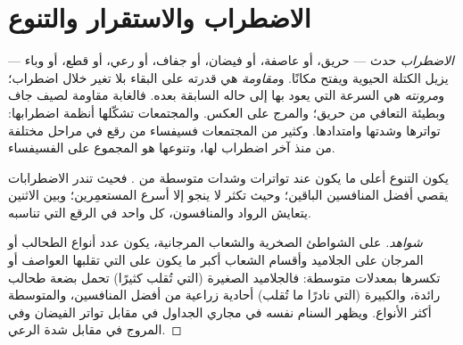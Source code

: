 \section{الاضطراب والاستقرار والتنوع}

\begin{definition}\label{def:b1:ecosystem-dynamics:disturbance}
\emph{الاضطراب} حدث --- حريق، أو عاصفة، أو فيضان، أو جفاف،
أو رعي، أو قطع، أو وباء --- يزيل الكتلة الحيوية ويفتح
مكانًا. و\emph{مقاومة}  هي قدرته على البقاء
بلا تغير خلال اضطراب؛ و\emph{مرونته} هي السرعة
التي يعود بها إلى حاله السابقة بعده. فالغابة
مقاومة لصيف جاف وبطيئة التعافي من حريق؛
والمرج على العكس. والمجتمعات تشكّلها أنظمة
اضطرابها: تواترها وشدتها وامتدادها. وكثير من
المجتمعات فسيفساء من رقع في مراحل مختلفة من
 منذ آخر اضطراب لها، وتنوعها هو
المجموع على الفسيفساء.
\end{definition}

\begin{proposition}\label{prop:b1:ecosystem-dynamics:idh}
يكون التنوع أعلى ما يكون عند تواترات وشدات متوسطة من
. فحيث تندر الاضطرابات يقصي أفضل المنافسين
الباقين؛ وحيث تكثر لا ينجو إلا أسرع
المستعمِرين؛ وبين الاثنين يتعايش الرواد والمنافسون،
كل واحد في الرقع التي تناسبه.
\end{proposition}
\begin{proof}[شواهد]
على الشواطئ الصخرية والشعاب المرجانية، يكون عدد أنواع الطحالب أو
المرجان على الجلاميد وأقسام الشعاب أكبر ما يكون على التي
تقلبها العواصف أو تكسرها بمعدلات متوسطة: فالجلاميد الصغيرة
(التي تُقلب كثيرًا) تحمل بضعة طحالب رائدة، والكبيرة (التي نادرًا ما تُقلب)
أحادية زراعية من أفضل المنافسين، والمتوسطة أكثر الأنواع.
ويظهر السنام نفسه في مجاري الجداول في مقابل تواتر الفيضان وفي
المروج في مقابل شدة الرعي.
\end{proof}

